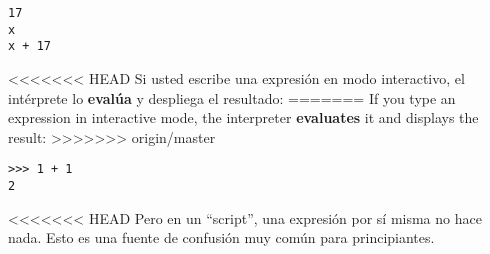 
\beforeverb
\begin{verbatim}
17
x
x + 17
\end{verbatim}
\afterverb
%
<<<<<<< HEAD
Si usted escribe una expresi\'on en modo interactivo, el int\'erprete lo
{\bf eval\'ua} y despliega el resultado:
=======
If you type an expression in interactive mode, the interpreter
{\bf evaluates} it and displays the result:
>>>>>>> origin/master

\beforeverb
\begin{verbatim}
>>> 1 + 1
2
\end{verbatim}
\afterverb
%
<<<<<<< HEAD
Pero en un ``script'', una expresi\'on por s\'i misma no hace nada. Esto es una fuente de confusi\'on muy com\'un para principiantes.

